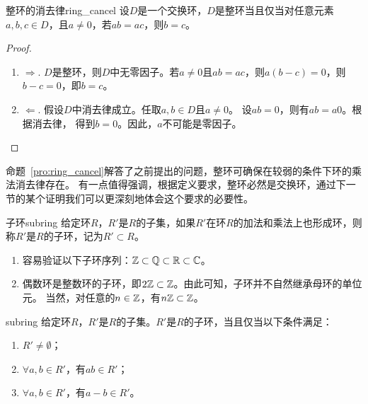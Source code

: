 \begin{proposition}{整环的消去律}{ring_cancel}
设$D$是一个交换环，$D$是整环当且仅当对任意元素$a,b,c\in D$，且$a \neq 0$，若$ab = ac$，则$b = c$。
\end{proposition}

\begin{proof}
\begin{enumerate}
\item $\Rightarrow$. $D$是整环，则$D$中无零因子。若$a \neq 0$且$ab = ac$，则$a(b - c) = 0$，则$b - c = 0$，即$b = c$。

\item $\Leftarrow$. 假设$D$中消去律成立。任取$a, b \in D$且$a \neq 0$。
设$ab = 0$，则有$ab = a0$。根据消去律，
得到$b = 0$。因此，$a$不可能是零因子。
\end{enumerate}
\end{proof}
命题~\ref{pro:ring_cancel}解答了之前提出的问题，整环可确保在较弱的条件下环的乘法消去律存在。
有一点值得强调，根据定义要求，整环必然是交换环，通过下一节的某个证明我们可以更深刻地体会这个要求的必要性。%

\begin{definition}{子环}{subring} 
给定环$R$，$R'$是$R$的子集，如果$R'$在环$R$的加法和乘法上也形成环，则称$R'$是$R$的子环，记为$R' \subset R$。
\end{definition}

\begin{example}
\begin{enumerate}
\item 容易验证以下子环序列：${\mathbb Z}\subset \mathbb{Q}\subset \mathbb{R}\subset \mathbb{C}$。

\item 偶数环是整数环的子环，即$2{\mathbb Z} \subset {\mathbb Z}$。由此可知，子环并不自然继承母环的单位元。
            当然，对任意的$n\in {\mathbb Z}$，有$n {\mathbb Z} \subset {\mathbb Z}$。
\end{enumerate}
\end{example}

\begin{proposition}{}{subring}
给定环$R$，$R'$是$R$的子集。$R'$是$R$的子环，当且仅当以下条件满足：
\begin{enumerate}
\item $R' \neq \emptyset$；
\item $\forall a, b \in R'$，有$ab \in R'$；
\item $\forall a, b \in R'$，有$a - b \in R'$。
\end{enumerate}
\end{proposition}

